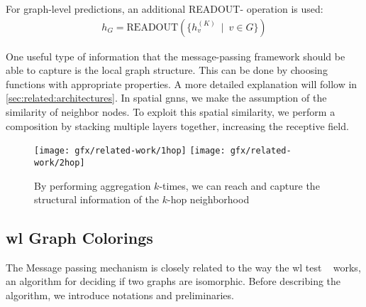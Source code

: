 For graph-level predictions, an additional READOUT- operation is used:
\begin{align*}
    h_{G} =\mathrm{READOUT}(\{h_{v}^{(K)}\ \mid \ v \in G\})
\end{align*}

One useful type of information that the message-passing framework should be able to capture is the local graph structure.
This can be done by choosing functions with appropriate properties.
A more detailed explanation will follow in \cref{sec:related:architectures}.
In spatial \acp{gnn}, we make the assumption of the similarity of neighbor nodes.
To exploit this spatial similarity, we perform a composition by stacking multiple layers together, increasing the receptive field.

\begin{figure}[ht]
    \centering
    \texttt{[image: gfx/related-work/1hop]}\hspace{1cm}
    \texttt{[image: gfx/related-work/2hop]}
    \caption{By performing aggregation $k$-times, we can reach and capture the
        structural information of the $k$-hop neighborhood}\label{fig:related:1hop}
\end{figure}


\subsection{\acl*{wl} Graph Colorings}
\label{sec:related:character:wl}
The Message passing mechanism is closely related to the way the \acf{wl} test ~\cite{Weisfeiler1968,Damke2020,Huang2022} works, an algorithm for deciding if two graphs are isomorphic.
Before describing the algorithm, we introduce notations and preliminaries.\\

